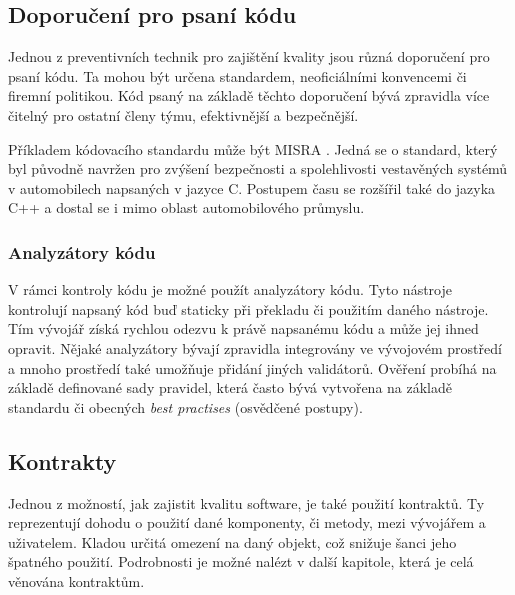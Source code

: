 	
	\subsection{Doporučení pro psaní kódu}
		Jednou z preventivních technik pro zajištění kvality jsou různá doporučení pro psaní kódu. Ta mohou být určena standardem, neoficiálními konvencemi či firemní politikou. Kód psaný na základě těchto doporučení bývá zpravidla více čitelný pro ostatní členy týmu, efektivnější a bezpečnější.
		
		Příkladem kódovacího standardu může být MISRA \cite{misra}. Jedná se o standard, který byl původně navržen pro zvýšení bezpečnosti a spolehlivosti vestavěných systémů v automobilech napsaných v jazyce C. Postupem času se rozšířil také do jazyka C++ a dostal se i mimo oblast automobilového průmyslu. 		
		
		\subsubsection{Analyzátory kódu}
			V rámci kontroly kódu je možné použít analyzátory kódu. Tyto nástroje kontrolují napsaný kód buď staticky při překladu či použitím daného nástroje. Tím vývojář získá rychlou odezvu k právě napsanému kódu a může jej ihned opravit. Nějaké analyzátory bývají zpravidla integrovány ve vývojovém prostředí a mnoho prostředí také umožňuje přidání jiných validátorů. Ověření probíhá na základě definované sady pravidel, která často bývá vytvořena na základě standardu či obecných \emph{best practises} (osvědčené postupy).
	
	\subsection{Kontrakty}
		Jednou z možností, jak zajistit kvalitu software, je také použití kontraktů. Ty reprezentují dohodu o použití dané komponenty, či metody, mezi vývojářem a uživatelem. Kladou určitá omezení na daný objekt, což snižuje šanci jeho špatného použití. Podrobnosti je možné nalézt v další kapitole, která je celá věnována kontraktům.